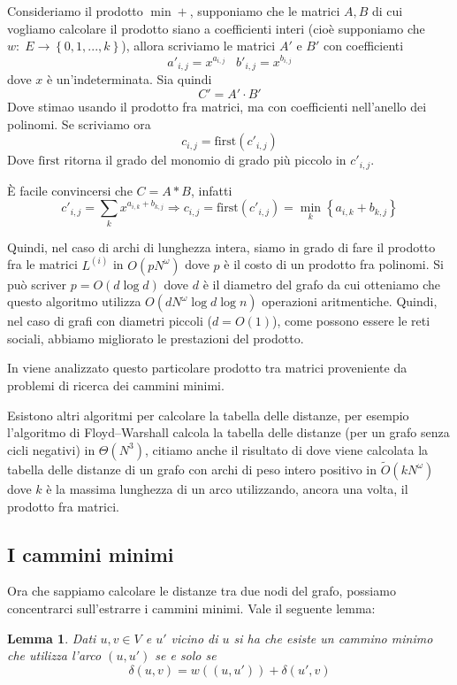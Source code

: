 \documentclass[a4paper,10pt]{amsbook}
\newcounter{counter1}
\theoremstyle{plain}
\newtheorem{mylem}[counter1]{Lemma}
\theoremstyle{definition}
\theoremstyle{remark}
\newcommand{\set}[1]{\left\{#1\right\}}
\newcommand{\pa}[1]{\left(#1\right)}
\begin{document}
Consideriamo il prodotto $\min +$, supponiamo che le matrici $A,B$ di
cui vogliamo calcolare il prodotto siano a coefficienti interi (cio\`e
supponiamo che $w:\; E \to \set{0, 1,...,k}$), allora scriviamo le
matrici $A'$ e $B'$ con coefficienti
\[ a'_{i,j} = x ^{a_{i,j}} \;\;\; b'_{i,j} = x ^{b_{i,j}} \]
dove $x$ è un'indeterminata. Sia quindi
\[ C' = A' \cdot B' \]
Dove stimao usando il prodotto fra matrici, ma con coefficienti
nell'anello dei polinomi. Se scriviamo ora 
\[ c _{i,j} = \mathrm{first}\pa{c'_{i,j}} \]
Dove $\mathrm{first}$ ritorna il grado del monomio di grado più
piccolo in $c'_{i,j}$.

È facile convincersi che $C = A * B$, infatti 
\[ c'_{i,j} = \sum _k x^{a_{i,k} + b_{k,j}} \Rightarrow c_{i,j} =
\mathrm{first} \pa{c'_{i,j}} = \min _k \set{ a_{i,k} + b_{k,j} } \]

Quindi, nel caso di archi di lunghezza intera, siamo in grado di fare
il prodotto fra le matrici $L^{(i)}$ in $O\pa{pN^\omega }$ dove $p$ è
il costo di un prodotto fra polinomi. Si pu\`o scriver $p = O\pa{d
  \log d}$ dove $d$ \`e il diametro del grafo da cui otteniamo che
questo algoritmo utilizza $O\pa{ d N ^\omega \log d \log n}$
operazioni aritmentiche. Quindi, nel caso di grafi con diametri
piccoli ($d = O(1)$), come possono essere le reti sociali, abbiamo
migliorato le prestazioni del prodotto.

In \cite{funnymult} viene analizzato questo particolare prodotto tra
matrici proveniente da problemi di ricerca dei cammini minimi.


Esistono altri algoritmi per calcolare la tabella delle distanze, per
esempio l'algoritmo di Floyd–Warshall calcola la tabella delle
distanze (per un grafo senza cicli negativi) in $\Theta\pa{ N^3}$,
citiamo anche il risultato di \cite{apspfmp} dove viene calcolata la
tabella delle distanze di un grafo con archi di peso intero positivo
in $\tilde O\pa{ kN^\omega}$ dove $k$ è la massima lunghezza di un
arco utilizzando, ancora una volta, il prodotto fra matrici.

\subsection{I cammini minimi}

Ora che sappiamo calcolare le distanze tra due nodi del grafo,
possiamo concentrarci sull'estrarre i cammini minimi. Vale il seguente
lemma:
\begin{mylem}
  \label{lem:vicinibuoni}
  Dati $u,v \in V$ e $u'$ vicino di $u$ si ha che esiste un cammino
  minimo che utilizza l'arco $(u,u')$ se e solo se
  \[ \delta \pa{ u,v} = w\pa{ (u,u') } + \delta \pa{ u',v} \]
\end{mylem}
\end{document}
